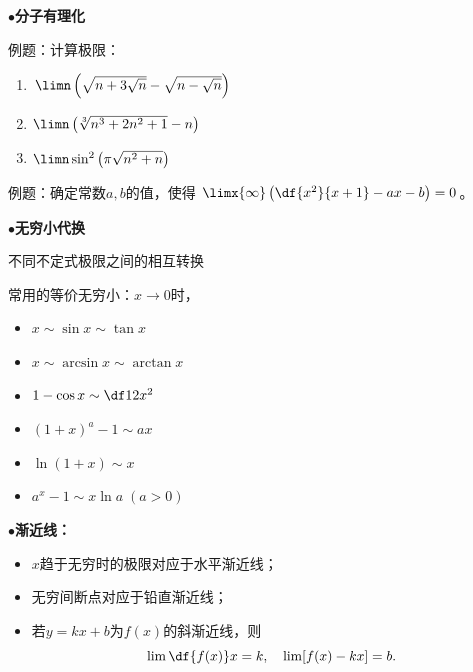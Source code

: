 $\bullet${\bf 分子有理化}

例题：计算极限：
\begin{enumerate}[(1)]
  \setlength{\itemindent}{1cm}
  \item $\limn\left(\sqrt{n+3\sqrt n}-\sqrt{n-\sqrt{n}}\right)$
  \item $\limn\left(\sqrt[3]{n^3+2n^2+1}-n\right)$
  \item $\limn\sin^2\left(\pi\sqrt{n^2+n}\right)$
\end{enumerate}

例题：确定常数$a,b$的值，使得
$\limx{\infty}\left(\df{x^2}{x+1}-ax-b\right)=0$。

$\bullet${\bf 无穷小代换}

不同不定式极限之间的相互转换
\begin{center}
\end{center}

常用的等价无穷小：$x\to 0$时，
\begin{itemize}
  \setlength{\itemindent}{1cm}
  \item $x\sim \sin x\sim \tan x$ 
  \item $x \sim\arcsin x\sim\arctan x$ 
  \item $1-\cos x\sim \df 12 x^2$ 
  \item $(1+x)^a-1\sim ax$ 
  \item $\ln(1+x)\sim x$ 
  \item $a^x-1\sim x\ln a\;(a>0)$
\end{itemize}

$\bullet${\bf 渐近线：}
\begin{itemize}
  \setlength{\itemindent}{1cm}
  \item $x$趋于无穷时的极限对应于水平渐近线；
  \item 无穷间断点对应于铅直渐近线；
  \item 若$y=kx+b$为$f(x)$的斜渐近线，则
  $$\lim\df{f(x)}x=k,\quad \lim[f(x)-kx]=b.$$
\end{itemize}

